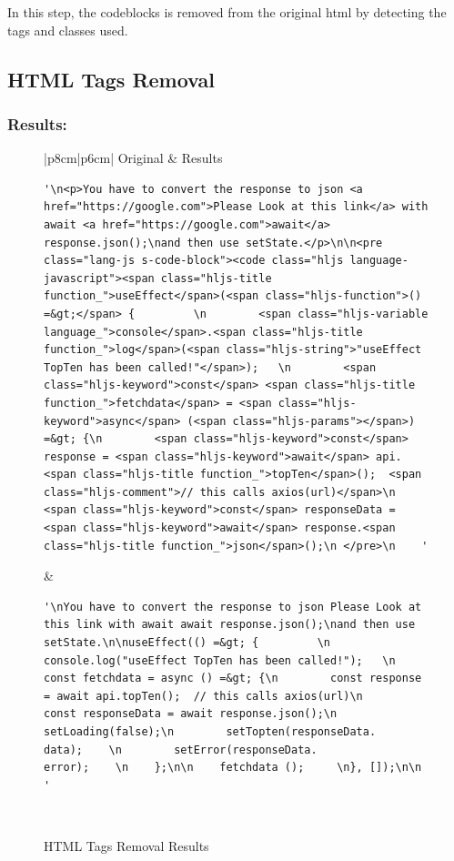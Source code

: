 \noindent In this step, the codeblocks is removed from the original html by detecting the tags and classes used.

\subsection{HTML Tags Removal} \label{html-tags-removal_results}
\subsubsection{Results:} \label{html-tags_results_results}
\newpage
\begin{figure}[H]
  \begin{center}
    \begin{tabular}{|p{8cm}|p{6cm}|}
    \hline\hline
    Original & Results \\ [0.5ex] %
    \hline 
    \begin{lstlisting}[frame=none]
'\n<p>You have to convert the response to json <a href="https://google.com">Please Look at this link</a> with await <a href="https://google.com">await</a> response.json();\nand then use setState.</p>\n\n<pre class="lang-js s-code-block"><code class="hljs language-javascript"><span class="hljs-title function_">useEffect</span>(<span class="hljs-function">() =&gt;</span> {         \n        <span class="hljs-variable language_">console</span>.<span class="hljs-title function_">log</span>(<span class="hljs-string">"useEffect TopTen has been called!"</span>);   \n        <span class="hljs-keyword">const</span> <span class="hljs-title function_">fetchdata</span> = <span class="hljs-keyword">async</span> (<span class="hljs-params"></span>) =&gt; {\n        <span class="hljs-keyword">const</span> response = <span class="hljs-keyword">await</span> api.<span class="hljs-title function_">topTen</span>();  <span class="hljs-comment">// this calls axios(url)</span>\n        <span class="hljs-keyword">const</span> responseData = <span class="hljs-keyword">await</span> response.<span class="hljs-title function_">json</span>();\n </pre>\n    '
    \end{lstlisting} &\begin{lstlisting}[frame=none]
'\nYou have to convert the response to json Please Look at this link with await await response.json();\nand then use setState.\n\nuseEffect(() =&gt; {         \n        console.log("useEffect TopTen has been called!");   \n        const fetchdata = async () =&gt; {\n        const response = await api.topTen();  // this calls axios(url)\n        const responseData = await response.json();\n        setLoading(false);\n        setTopten(responseData.
data);    \n        setError(responseData.
error);    \n    };\n\n    fetchdata ();     \n}, []);\n\n    '
    \end{lstlisting} \\ 
    \hline 
    \end{tabular}
  \end{center}
  \caption{HTML Tags Removal Results}
  \label{fig:html-tags-removal_results_results}
\end{figure}

